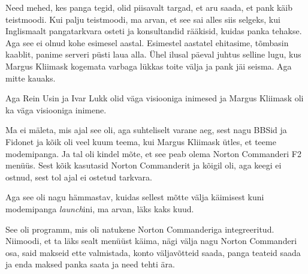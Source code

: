 
Need mehed, kes panga tegid, olid piisavalt targad, et aru saada, et pank käib teistmoodi. Kui palju teistmoodi, ma arvan, et see sai alles siis selgeks, kui Inglismaalt pangatarkvara osteti ja konsultandid rääkisid, kuidas panka tehakse. Aga see ei olnud kohe esimesel aastal. Esimestel aastatel ehitasime, tõmbasin kaablit, panime serveri püsti laua alla. Ühel ilusal päeval juhtus selline lugu, kus Margus Kliimask kogemata varbaga lükkas toite välja ja pank jäi seisma. Aga mitte kauaks. 

Aga Rein Usin ja Ivar Lukk olid väga visiooniga inimesed ja Margus Kliimask oli ka väga visiooniga inimene. 

Ma ei mäleta, mis ajal see oli, aga suhteliselt varane aeg, sest nagu BBSid ja Fidonet ja kõik oli veel kuum teema, kui Margus Kliimask ütles, et teeme modemipanga. Ja tal oli kindel mõte, et see peab olema Norton Commanderi F2 menüüs. Sest kõik kasutasid Norton Commanderit ja kõigil oli, aga keegi ei ostnud, sest tol ajal ei ostetud tarkvara. 


Aga see oli nagu hämmastav, kuidas sellest mõtte välja käimisest kuni modemipanga \emph{launch}ini, ma arvan, läks kaks kuud.


See  oli programm, mis oli natukene Norton Commanderiga integreeritud. Niimoodi, et ta läks sealt menüüst käima, nägi välja nagu Norton Commanderi osa, said makseid ette valmistada, konto väljavõtteid saada, panga teateid saada ja enda maksed panka saata ja need tehti ära.


